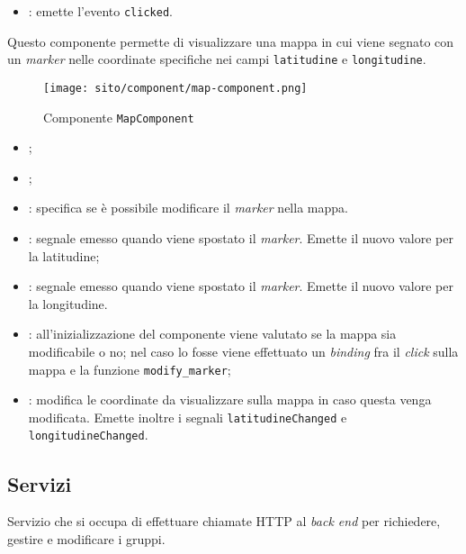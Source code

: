 \begin{itemize}
    \item {}: emette l'evento \texttt{clicked}.
\end{itemize}

\label{par:MapComponent}
Questo componente permette di visualizzare una mappa in cui viene segnato con
un \textit{marker} nelle coordinate specifiche nei campi \texttt{latitudine} e
\texttt{longitudine}.
\begin{figure}[H]
    \centerline{\texttt{[image: sito/component/map-component.png]}}

    \caption{Componente \texttt{MapComponent}}
\end{figure}

\begin{itemize}
    \item {};
    \item {};
    \item {}: specifica se è possibile modificare il
          \textit{marker} nella mappa.
\end{itemize}

\begin{itemize}
    \item {}: segnale emesso quando viene spostato il
          \textit{marker}. Emette il nuovo valore per la latitudine;
    \item {}: segnale emesso quando viene spostato il
          \textit{marker}. Emette il nuovo valore per la longitudine.
\end{itemize}

\begin{itemize}
    \item {}: all'inizializzazione del componente viene valutato
          se la mappa sia modificabile o no; nel caso lo fosse viene effettuato
          un
          \textit{binding} fra il \textit{click} sulla mappa e la funzione
          \texttt{modify\_marker};
    \item {}: modifica le coordinate da visualizzare sulla
          mappa in caso questa venga modificata. Emette inoltre i segnali
          \texttt{latitudineChanged} e \texttt{longitudineChanged}.
\end{itemize}

\subsection{Servizi}
\label{par:GruppiService}
Servizio che si occupa di effettuare chiamate HTTP al \textit{back end} per
richiedere, gestire e modificare i gruppi.

